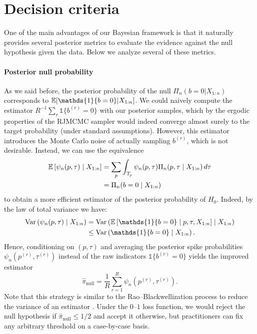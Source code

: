 \section{Decision criteria} 

One of the main advantages of our Bayesian framework is that it naturally provides several posterior metrics to evaluate the evidence against the null hypothesis given the data. Below we analyze several of these metrics.


\paragraph{Posterior null probability} As we said before, the posterior probability of the null \(\Pi_n(b=0|X_{1:n})\) corresponds to \(\E[\mathds{1}\{b=0\}|X_{1:n}]\). We could naively compute the estimator \(R^{-1}\sum_{r} \mathds{1}\{b^{(r)}=0\}\) with our posterior samples, which by the ergodic properties of the \acs{RJMCMC} sampler would indeed converge almost surely to the target probability (under standard assumptions). However, this estimator introduces the Monte Carlo noise of actually sampling \(b^{(r)}\), which is not desirable. Instead, we can use the equivalence
\begin{align*}
  \mathbb{E}\left[\psi_n(p,\tau)\mid X_{1:n}\right] &= \sum_p \int_{\mathcal T_p} \psi_n(p,\tau) \Pi_n(p,\tau\mid X_{1:n})\, d\tau\\
  &= \Pi_n(b=0\mid X_{1:n})
\end{align*}
to obtain a more efficient estimator of the posterior probability of \(H_0\). Indeed, by the law of total variance we have:
\begin{align*}
  \var\left(\psi_n(p,\tau)\mid X_{1:n}\right) &= \var\left(\E\left[\mathds{1}\{b=0\}\mid p, \tau, X_{1:n}\right]\mid X_{1:n}\right)\\
  &\leq \var\left(\mathds{1}\{b=0\}\mid X_{1:n}\right).
\end{align*}
Hence, conditioning on \((p,\tau)\) and averaging the posterior spike probabilities \(\psi_n(p^{(r)}, \tau^{(r)})\) instead of the raw indicators \(\mathds{1}\{b^{(r)}=0\}\) yields the improved estimator
\[
\hat \pi_{\text{null}} = \frac{1}{R}\sum_{r=1}^R \psi_n(p^{(r)}, \tau^{(r)}).
\]
Note that this strategy is similar to the Rao--Blackwellization process to reduce the variance of an estimator \citep[Theorem 7.9]{ghosh2006introduction}. Under the \(0\)--\(1\) loss function, we would reject the null hypothesis if \(\hat \pi_{\text{null}} \leq 1/2\) and accept it otherwise, but practitioners can fix any arbitrary threshold on a case-by-case basis.

